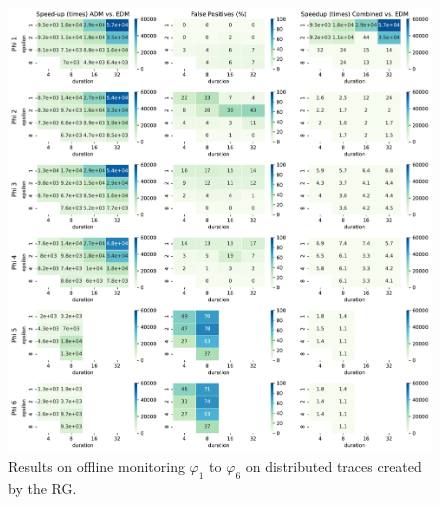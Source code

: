 \documentclass[iicol,lineno]{sn-jnl}
\newcommand{\?}{\text{?}}
\begin{document}
	\clearpage
	\begin{figure}[p]
		\begin{center}
			\includegraphics[width=\linewidth]{speedup_all}
			\caption{Results on offline monitoring $\varphi_{1}$ to $\varphi_{6}$ on distributed traces created by the RG.}
			\label{fig:rgresults}
		\end{center}
	\end{figure}
	\clearpage
\end{document}
